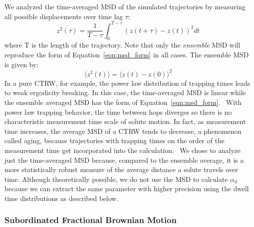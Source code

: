 \documentclass{article}
\begin{document}
  We analyzed the time-averaged MSD of the simulated trajectories by measuring
  all possible displacements over time lag $\tau$:
  \begin{equation}
  \overline{z^2(\tau)} = \dfrac{1}{T - \tau}\int_{0}^{T - \tau} (z(t + \tau) - z(t))^2 dt
  \end{equation}
  where T is the length of the trajectory. Note that only the \textit{ensemble} MSD
  will reproduce the form of Equation~\ref{eqn:msd_form} in all cases. The ensemble
  MSD is given by:
  \begin{equation}
  \langle z^2(t) \rangle = \langle z(t) - z(0) \rangle^2
  \label{eqn:ensemble_msd}
  \end{equation} 
  In a pure CTRW, for example, the power law distribution of trapping times leads to
  weak ergodicity breaking. In this case, the time-averaged MSD is linear while the ensemble averaged
  MSD has the form of Equation~\ref{eqn:msd_form}.~\cite{meroz_toolbox_2015} With power
  law trapping behavior, the time between hops diverges so there is no characteristic
  measurement time scale of solute motion. In fact, as measurement time increases, the 
  average MSD of a CTRW tends to decrease, a phenomenon called aging, because trajectories 
  with trapping times on the order of the measurement time get incorporated into the 
  calculation.~\cite{bel_weak_2005} We chose to analyze just the time-averaged MSD 
  because, compared to the ensemble average, it is a more statistically robust measure
  of the average distance a solute travels over time. 
  Although theoretically possible, we do
  not use the MSD to calculate $\alpha_d$ because we can extract the same parameter 
  with higher precision using the dwell time distributions as described below.
  
  
  \subsubsection{Subordinated Fractional Brownian Motion}\label{method:sfbm}
\end{document}
